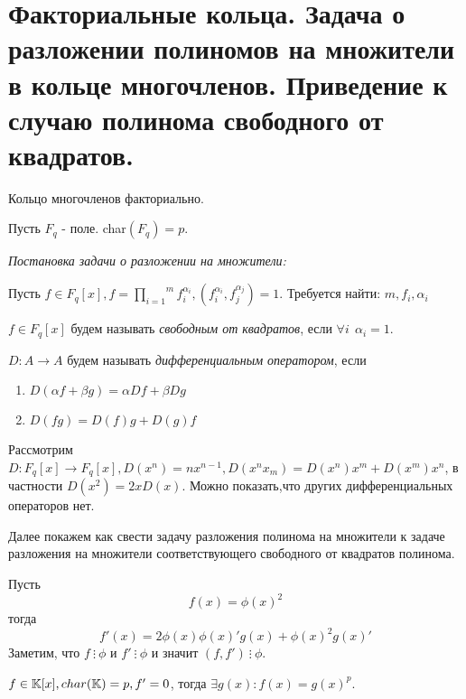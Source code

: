 \section{Факториальные кольца. Задача о разложении полиномов на множители в кольце многочленов. Приведение к случаю полинома свободного от квадратов.}

\begin{thm}
  Кольцо многочленов факториально. \newline
\end{thm}

Пусть $ F_{q} $ - поле. char$(F_q) = p $. \newline

\emph{Постановка задачи о разложении на множители:} \newline

Пусть $ f \in F_{q}[x],  f = \overset{m}{\underset{i = 1}{\prod}} f_i^{\alpha_i},
 (f_i^{\alpha_i}, f_j^{\alpha_j}) = 1 $. Требуется найти: $ m, f_i, \alpha_i $

\begin{defn}
  $ f \in F_{q}[x] $ будем называть \emph{свободным от квадратов}, если $ \forall i ~~ \alpha_i = 1 $.
\end{defn}

\begin{defn}
  $ D : A \rightarrow A $ будем называть \emph{дифференциальным оператором}, если 
  \begin{enumerate}
    \item $ D({\alpha}f + {\beta}g) = {\alpha}Df + {\beta}Dg $
    \item $ D(fg) = D(f)g + D(g)f $
  \end{enumerate}
\end{defn}

Рассмотрим $ D : F_q[x] \rightarrow F_q[x], D(x^n) = nx^{n-1}, D(x^{n}x_{m}) = D(x^n)x^m + D(x^m)x^n $, 
в частности $ D(x^2) = 2xD(x) $. Можно показать,что других дифференциальных операторов нет.

Далее покажем как свести задачу разложения полинома на множители к задаче разложения на множители соответствующего
свободного от квадратов полинома.

Пусть \[ f(x) = \phi(x)^2 \] тогда \[ f'(x) = 2\phi(x)\phi(x)'g(x) + \phi(x)^2g(x)' \]
Заметим, что $ f ~ \vdots ~ \phi $ и $ f' ~ \vdots ~ \phi $ и значит $ (f, f') ~ \vdots ~ \phi $.

\begin{lem}
  $ f \in \mathbb{K}[x], char(\mathbb{K}) = p, f' = 0 $, тогда $ \exists g(x) : f(x) = g(x)^p $. 
\end{lem}


